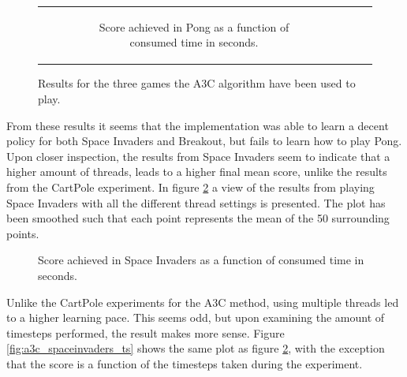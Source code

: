 \documentclass[11pt]{article}
\begin{document}
\begin{figure}[H]
\begin{tabular}[c]{ccc}
\begin{subfigure}[t]{.32\textwidth}
        \caption{Score achieved in Pong as a function of
        consumed time in seconds.}
    \end{subfigure}
  \end{tabular}
  \caption{Results for the three games the A3C algorithm have been used to play.}
  \label{fig:all_atari}
\end{figure}

From these results it seems that the implementation was able to learn
a decent policy for both Space Invaders and Breakout, but fails
to learn how to play Pong.
Upon closer inspection, the results from Space Invaders seem to indicate 
that a higher amount of threads, leads to a higher final mean score,
unlike the results from the CartPole experiment.
In figure \ref{fig:a3c_spaceinvaders} a view of the results from
playing Space Invaders with all the different thread settings is presented.
The plot has been smoothed such that each point represents the mean of the
50 surrounding points.

\begin{figure}[H]
    \caption{Score achieved in Space Invaders as a function of
    consumed time in seconds.}
    \label{fig:a3c_spaceinvaders}
\end{figure}

Unlike the CartPole experiments for the A3C method, using multiple threads
led to a higher learning pace.
This seems odd, but upon examining the amount of timesteps performed,
the result makes more sense.
Figure \ref{fig:a3c_spaceinvaders_ts} shows the same plot as
figure \ref{fig:a3c_spaceinvaders}, with the
exception that the score is a function of the timesteps taken
during the experiment.
\end{document}
